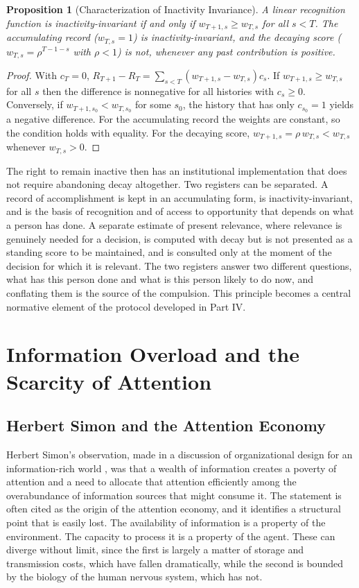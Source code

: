 \documentclass[11pt]{report}
\newtheorem{proposition}[theorem]{Proposition}
\theoremstyle{definition}
\theoremstyle{remark}
\begin{document}
\begin{proposition}[Characterization of Inactivity Invariance]\label{prop:inactive}
A linear recognition function is inactivity-invariant if and only if $w_{T+1,s}\ge w_{T,s}$ for all $s<T$. The accumulating record ($w_{T,s}=1$) is inactivity-invariant, and the decaying score ($w_{T,s}=\rho^{T-1-s}$ with $\rho<1$) is not, whenever any past contribution is positive.
\end{proposition}

\begin{proof}
With $c_T=0$, $R_{T+1}-R_T=\sum_{s<T}(w_{T+1,s}-w_{T,s})c_s$. If $w_{T+1,s}\ge w_{T,s}$ for all $s$ then the difference is nonnegative for all histories with $c_s\ge0$. Conversely, if $w_{T+1,s_0}<w_{T,s_0}$ for some $s_0$, the history that has only $c_{s_0}=1$ yields a negative difference. For the accumulating record the weights are constant, so the condition holds with equality. For the decaying score, $w_{T+1,s}=\rho\,w_{T,s}<w_{T,s}$ whenever $w_{T,s}>0$.
\end{proof}

The right to remain inactive then has an institutional implementation that does not require abandoning decay altogether. Two registers can be separated. A record of accomplishment is kept in an accumulating form, is inactivity-invariant, and is the basis of recognition and of access to opportunity that depends on what a person has done. A separate estimate of present relevance, where relevance is genuinely needed for a decision, is computed with decay but is not presented as a standing score to be maintained, and is consulted only at the moment of the decision for which it is relevant. The two registers answer two different questions, what has this person done and what is this person likely to do now, and conflating them is the source of the compulsion. This principle becomes a central normative element of the protocol developed in Part IV.

\chapter{Information Overload and the Scarcity of Attention}

\section{Herbert Simon and the Attention Economy}

Herbert Simon's observation, made in a discussion of organizational design for an information-rich world \cite{simon71}, was that a wealth of information creates a poverty of attention and a need to allocate that attention efficiently among the overabundance of information sources that might consume it. The statement is often cited as the origin of the attention economy, and it identifies a structural point that is easily lost. The availability of information is a property of the environment. The capacity to process it is a property of the agent. These can diverge without limit, since the first is largely a matter of storage and transmission costs, which have fallen dramatically, while the second is bounded by the biology of the human nervous system, which has not.
\end{document}
